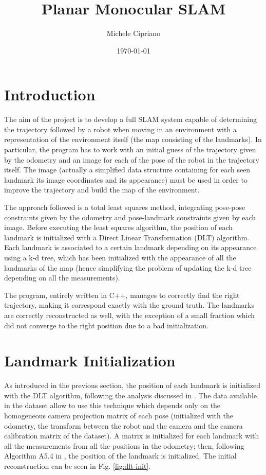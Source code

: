 \documentclass[11pt]{extarticle}
\title{Planar Monocular SLAM}
\author{Michele Cipriano}
\date{\today}
\begin{document}
\maketitle

\section{Introduction}
The aim of the project is to develop a full SLAM system capable of determining
the trajectory followed by a robot when moving in an environment with a
representation of the environment itself (the map consisting of the landmarks).
In particular, the program has to work with an initial guess of the trajectory
given by the odometry and an image for each of the pose of the robot in the
trajectory itself. The image (actually a simplified data structure
containing for each seen landmark its image coordinates and its appearance)
must be used in order to improve the trajectory and build the map of the
environment.

The approach followed is a total least squares method, integrating pose-pose
constraints given by the odometry and pose-landmark constraints given by
each image. Before executing the least squares algorithm, the position of each
landmark is initialized with a Direct Linear Transformation (DLT) algorithm.
Each landmark is associated to a certain landmark depending on its appearance
using a k-d tree, which has been initialized with the appearance of all the
landmarks of the map (hence simplifying the problem of updating the k-d
tree depending on all the measurements).

The program, entirely written in C++, manages to correctly find the right
trajectory, making it correspond exactly with the ground truth. The
landmarks are correctly reconstructed as well, with the exception of
a small fraction which did not converge to the right position due to a bad
initialization.

\section{Landmark Initialization}
As introduced in the previous section, the position of each landmark is
initialized with the DLT algorithm, following the analysis discussed in
\cite{Hartley2004}. The data available in the dataset allow to use this
technique which depends only on the homogeneous camera projection matrix of
each pose (initialized with the odometry, the transform between the robot
and the camera and the camera calibration matrix of the dataset). A matrix
is initialized for each landmark with all the measurements from all the
positions in the odometry; then, following Algorithm A5.4 in \cite{Hartley2004},
the position of the landmark is initialized. The initial reconstruction
can be seen in Fig. \ref{fig:dlt-init}.
\end{document}
